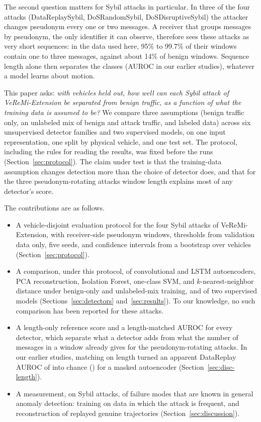 The second question matters for Sybil attacks in particular. In three of the four attacks (DataReplaySybil,
DoSRandomSybil, DoSDisruptiveSybil) the attacker changes pseudonym every one or two messages. A receiver that
groups messages by pseudonym, the only identifier it can observe, therefore sees these attacks as very short
sequences: in the data used here, 95\% to 99.7\% of their windows contain one to three messages, against about
14\% of benign windows. Sequence length alone then separates the classes (AUROC  in our earlier
studies), whatever a model learns about motion.

This paper asks: \emph{with vehicles held out, how well can each Sybil attack of VeReMi-Extension be separated from
benign traffic, as a function of what the training data is assumed to be?} We compare three assumptions (benign
traffic only, an unlabeled mix of benign and attack traffic, and labeled data) across six unsupervised detector
families and two supervised models, on one input representation, one split by physical vehicle, and one test set.
The protocol, including the rules for reading the results, was fixed before the runs (Section~\ref{sec:protocol}).
The claim under test is that the training-data assumption changes detection more than the choice of detector does,
and that for the three pseudonym-rotating attacks window length explains most of any detector's score.

The contributions are as follows.
\begin{itemize}
  \item A vehicle-disjoint evaluation protocol for the four Sybil attacks of VeReMi-Extension, with receiver-side
  pseudonym windows, thresholds from validation data only, five seeds, and confidence intervals from a bootstrap
  over vehicles (Section~\ref{sec:protocol}).
  \item A comparison, under this protocol, of convolutional and LSTM autoencoders, PCA reconstruction, Isolation
  Forest, one-class SVM, and $k$-nearest-neighbor distance under benign-only and unlabeled-mix training, and of two
  supervised models (Sections~\ref{sec:detectors} and~\ref{sec:results}). To our knowledge, no such comparison has
  been reported for these attacks.
  \item A length-only reference score and a length-matched AUROC for every detector, which separate what a detector
  adds from what the number of messages in a window already gives for the pseudonym-rotating attacks. In our
  earlier studies, matching on length turned an apparent DataReplay AUROC of  into chance
  () for a masked autoencoder (Section~\ref{sec:disc-length}).
  \item A measurement, on Sybil attacks, of failure modes that are known in general anomaly detection: training on
  data in which the attack is frequent, and reconstruction of replayed genuine trajectories
  (Section~\ref{sec:discussion}). 
\end{itemize}

